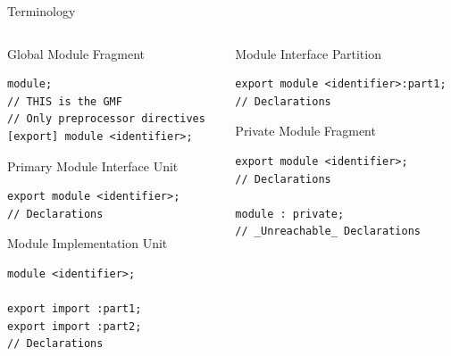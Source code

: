 \documentclass[]{beamer}
\begin{document}

\begin{frame}[containsverbatim]{Terminology}
  \begin{columns}
    \begin{column}{0.5\textwidth}

      \begin{block}{\footnotesize Global Module Fragment}
        \begin{verbatim}
module;
// THIS is the GMF
// Only preprocessor directives
[export] module <identifier>;
    \end{verbatim}
      \end{block}

      \begin{block}{\footnotesize Primary Module Interface Unit}
        \begin{verbatim}
export module <identifier>;
// Declarations
    \end{verbatim}
      \end{block}

      \begin{block}{\footnotesize Module Implementation Unit}
        \begin{verbatim}
module <identifier>;

export import :part1;
export import :part2;
// Declarations
        \end{verbatim}
      \end{block}
    \end{column}

    \begin{column}{0.5\textwidth}

      \begin{block}{\footnotesize Module Interface Partition}
        \begin{verbatim}
export module <identifier>:part1;
// Declarations
        \end{verbatim}
      \end{block}

      \begin{block}{\footnotesize Private Module Fragment}
        \begin{verbatim}
export module <identifier>;
// Declarations

module : private;
// _Unreachable_ Declarations
        \end{verbatim}
      \end{block}

    \end{column}

  \end{columns}
\end{frame}
\end{document}
